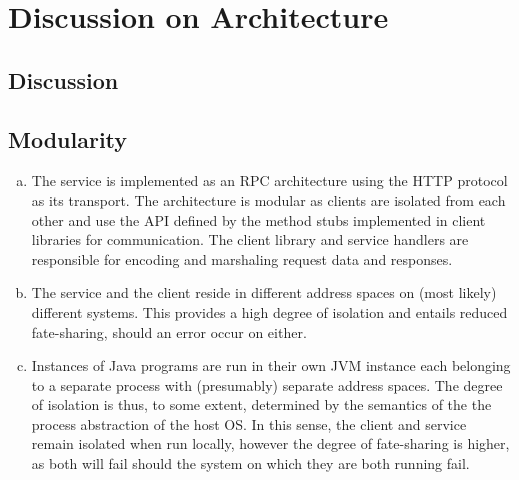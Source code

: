 \documentclass[11pt,a4paper,english]{article}
\begin{document}
\section{Discussion on Architecture}
\subsection{Discussion }
\subsection{Modularity}
\begin{enumerate}[(a)]
\item{The service is implemented as an RPC architecture using the HTTP protocol
    as its transport. The architecture is modular as clients are isolated from
    each other and use the API defined by the method stubs implemented in client
    libraries for communication. The client library and service handlers are
    responsible for encoding and marshaling request data and responses.}

\item{The service and the client reside in different address spaces on (most
    likely) different systems. This provides a high degree of isolation and
    entails reduced fate-sharing, should an error occur on either.}

\item{Instances of Java programs are run in their own JVM instance each
    belonging to a separate process with (presumably) separate address
    spaces. The degree of isolation is thus, to some extent, determined by the
    semantics of the the process abstraction of the host OS. In this sense, the
    client and service remain isolated when run locally, however the degree of
    fate-sharing is higher, as both will fail should the system on which they
    are both running fail.}
\end{enumerate}
\end{document}
